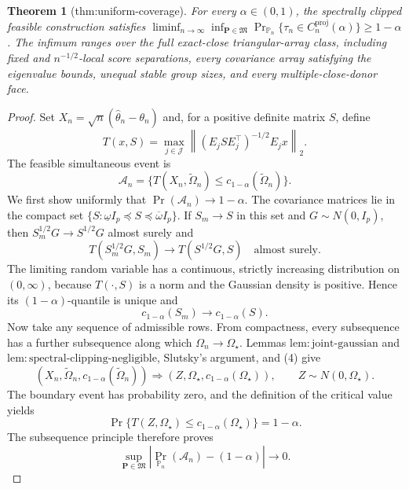 \documentclass{article}
\newtheorem{theorem}{Theorem}
\begin{document}
\begin{theorem}[thm:uniform-coverage]\label{thm:uniform-coverage}
For every \(\alpha\in(0,1)\), the spectrally clipped feasible construction satisfies \(\liminf_{n\to\infty}\inf_{\mathbf P\in\mathfrak M}\Pr_{\mathbb P_n}\{\tau_n\in C_n^{\mathrm{proj}}(\alpha)\}\ge1-\alpha\). The infimum ranges over the full exact-close triangular-array class, including fixed and \(n^{-1/2}\)-local score separations, every covariance array satisfying the eigenvalue bounds, unequal stable group sizes, and every multiple-close-donor face.
\end{theorem}
\begin{proof}
Set \(X_n=\sqrt n(\widehat\theta_n-\theta_n)\) and, for a positive definite matrix \(S\), define
\[
 T(x,S)=\max_{j\in\mathcal J}
 \left\|(E_jSE_j^{\top})^{-1/2}E_jx\right\|_2.
\]
The feasible simultaneous event is
\[
 \mathcal A_n=\{T(X_n,\widetilde\Omega_n)\le c_{1-\alpha}(\widetilde\Omega_n)\}.
\tag{3}
\]
We first show uniformly that \(\Pr(\mathcal A_n)\to1-\alpha\).  The covariance matrices lie in the compact set
\(
 \{S:\underline\omega I_p\preceq S\preceq\overline\omega I_p\}
\).
If \(S_m\to S\) in this set and \(G\sim N(0,I_p)\), then \(S_m^{1/2}G\to S^{1/2}G\) almost surely and
\[
 T(S_m^{1/2}G,S_m)\longrightarrow T(S^{1/2}G,S)
 \quad\text{almost surely}.
\]
The limiting random variable has a continuous, strictly increasing distribution on \((0,\infty)\), because \(T(\cdot,S)\) is a norm and the Gaussian density is positive.  Hence its \((1-\alpha)\)-quantile is unique and
\[
 c_{1-\alpha}(S_m)\longrightarrow c_{1-\alpha}(S).
\tag{4}
\]
Now take any sequence of admissible rows.  From compactness, every subsequence has a further subsequence along which \(\Omega_n\to\Omega_\star\).  Lemmas \(\mathrm{lem:joint\text{-}gaussian}\) and \(\mathrm{lem:spectral\text{-}clipping\text{-}negligible}\), Slutsky's argument, and (4) give
\[
 (X_n,\widetilde\Omega_n,c_{1-\alpha}(\widetilde\Omega_n))
 \Rightarrow(Z,\Omega_\star,c_{1-\alpha}(\Omega_\star)),
 \qquad Z\sim N(0,\Omega_\star).
\]
The boundary event has probability zero, and the definition of the critical value yields
\[
 \Pr\{T(Z,\Omega_\star)\le c_{1-\alpha}(\Omega_\star)\}=1-\alpha.
\]
The subsequence principle therefore proves
\[
 \sup_{\mathbf P\in\mathfrak M}
 |\Pr_{\mathbb P_n}(\mathcal A_n)-(1-\alpha)|\longrightarrow0.
\tag{5}
\]


\end{proof}
\end{document}
